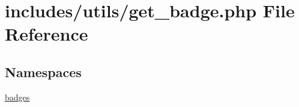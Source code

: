 \hypertarget{get__badge_8php}{}\section{includes/utils/get\+\_\+badge.php File Reference}
\label{get__badge_8php}
\subsection*{Namespaces}
\begin{DoxyCompactItemize}
\item 
 \hyperlink{namespacebadges}{badges}
\end{DoxyCompactItemize}
